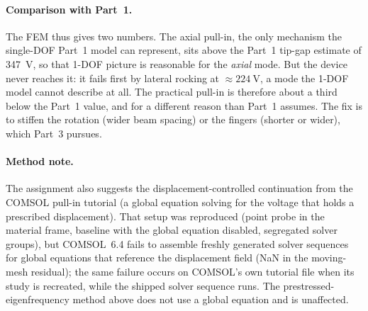 {\color{blue}%
\paragraph{Comparison with Part~1.}
The FEM thus gives two numbers. The axial pull-in, the only mechanism the
single-DOF Part~1 model can represent, sits above the Part~1 tip-gap estimate
of \SI{347}{\volt}, so that 1-DOF picture is reasonable for the \emph{axial}
mode. But the device never reaches it: it fails first by lateral rocking at
$\approx\SI{224}{\volt}$, a mode the 1-DOF model cannot describe at all. The
practical pull-in is therefore about a third below the Part~1 value, and for a
different reason than Part~1 assumes. The fix is to stiffen the rotation (wider
beam spacing) or the fingers (shorter or wider), which Part~3 pursues.}

{\color{blue}%
\paragraph{Method note.}
The assignment also suggests the displacement-controlled continuation from the
COMSOL pull-in tutorial (a global equation solving for the voltage that holds a
prescribed displacement). That setup was reproduced (point probe in the
material frame, baseline with the global equation disabled, segregated solver
groups), but COMSOL~6.4 fails to assemble freshly generated solver sequences
for global equations that reference the displacement field (NaN in the
moving-mesh residual); the same failure occurs on COMSOL's own tutorial file
when its study is recreated, while the shipped solver sequence runs. The
prestressed-eigenfrequency method above does not use a global equation and is
unaffected.}
